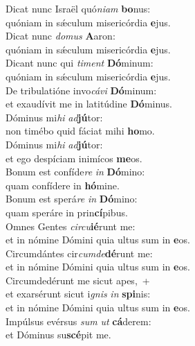 \evenverse Dicat nunc Israël quó\textit{ni}\textit{am} \textbf{bo}nus:~\*\\
\evenverse quóniam in sǽculum misericórdia \textbf{e}jus.\\
\oddverse Dicat nunc \textit{do}\textit{mus} \textbf{A}aron:~\*\\
\oddverse quóniam in sǽculum misericórdia \textbf{e}jus.\\
\evenverse Dicant nunc qui \textit{ti}\textit{ment} \textbf{Dó}minum:~\*\\
\evenverse quóniam in sǽculum misericórdia \textbf{e}jus.\\
\oddverse De tribulatióne invo\textit{cá}\textit{vi} \textbf{Dó}minum:~\*\\
\oddverse et exaudívit me in latitúdine \textbf{Dó}minus.\\
\evenverse Dóminus mi\textit{hi} \textit{ad}\textbf{jú}tor:~\*\\
\evenverse non timébo quid fáciat mihi \textbf{ho}mo.\\
\oddverse Dóminus mi\textit{hi} \textit{ad}\textbf{jú}tor:~\*\\
\oddverse et ego despíciam inimícos \textbf{me}os.\\
\evenverse Bonum est confíde\textit{re} \textit{in} \textbf{Dó}mino:~\*\\
\evenverse quam confídere in \textbf{hó}mine.\\
\oddverse Bonum est sperá\textit{re} \textit{in} \textbf{Dó}mino:~\*\\
\oddverse quam speráre in prin\textbf{cí}pibus.\\
\evenverse Omnes Gentes \textit{cir}\textit{cu}\textbf{ié}runt me:~\*\\
\evenverse et in nómine Dómini quia ultus sum in \textbf{e}os.\\
\oddverse Circumdántes cir\textit{cum}\textit{de}\textbf{dé}runt me:~\*\\
\oddverse et in nómine Dómini quia ultus sum in \textbf{e}os.\\
\evenverse Circumdedérunt me sicut apes,~+\\
\evenverse  et exarsérunt sicut i\textit{gnis} \textit{in} \textbf{spi}nis:~\*\\
\evenverse et in nómine Dómini quia ultus sum in \textbf{e}os.\\
\oddverse Impúlsus evérsus \textit{sum} \textit{ut} \textbf{cá}derem:~\*\\
\oddverse et Dóminus su\textbf{scé}pit me.\\
